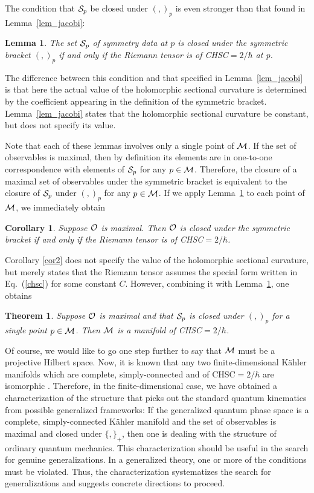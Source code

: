 \documentclass[12pt,aps,eqsecnum,tighten,nofootinbib]{revtex4-2}
\newtheorem{theorem}{Theorem}[section]
\newtheorem{lemma}{Lemma}[section]
\def\M{{\cal M}}
\newcommand{\eqn}[1]{Eq.~(\ref{#1})}
\newtheorem{cor}{Corollary}
\begin{document}
The condition that ${\cal S}_p$ be closed under $( , )_p$ is even stronger
than that found in Lemma~\ref{lem_jacobi}:
%
\begin{lemma}\label{lem_sb}
The set ${\cal S}_p$ of symmetry data at $p$ is closed under
the symmetric bracket $( , )_p$ if and only if the Riemann
tensor is of CHSC$=2/\hbar$ at p.
\end{lemma}
%
The difference between this condition and that specified in
Lemma~\ref{lem_jacobi} is that here the actual value of the
holomorphic sectional curvature is determined by the coefficient
appearing in the definition of the symmetric bracket.
Lemma~\ref{lem_jacobi} states that the holomorphic sectional curvature
be constant, but does not specify its value.

Note that each of these lemmas involves only a single point of $\M$.
If the set of observables is maximal, then by definition its elements
are in one-to-one correspondence with elements of ${\cal S}_p$ for any
$p\in\M$.  Therefore, the closure of a maximal set of observables
under the symmetric bracket is equivalent to the closure of ${\cal
S}_p$ under $( , )_p$ for any $p\in\M$.  If we apply
Lemma~\ref{lem_sb} to each point of $\M$, we immediately obtain
%
\begin{cor}
Suppose ${\cal O}$ is maximal.  Then ${\cal O}$ is closed under
the symmetric bracket if and only if the Riemann tensor is
of CHSC$=2/\hbar$.
\end{cor}
%

Corollary \ref{cor2}  does not specify the value of the holomorphic
sectional curvature, but merely states that the Riemann tensor assumes
the special form written in \eqn{chsc} for some constant $C$.  However,
combining it with Lemma~\ref{lem_sb}, one obtains
%
\begin{theorem}
Suppose ${\cal O}$ is maximal and that ${\cal S}_p$ is
closed under $( , )_p$ for a single point $p\in\M$.  Then
$\M$ is a manifold of CHSC$=2/\hbar$.

\end{theorem}

Of course, we would like to go one step further to say that $\M$ must
be a projective Hilbert space. Now, it is known that any two
finite-dimensional K\"ahler manifolds which are complete,
simply-connected and of CHSC$=2/\hbar$ are isomorphic \cite{yano}.
Therefore, in the finite-dimensional case, we have obtained a
characterization of the structure that picks out the standard quantum
kinematics from possible generalized frameworks: If the generalized
quantum phase space is a complete, simply-connected K\"ahler manifold
and the set of observables is maximal and closed under $\{ , \}_+$,
then one is dealing with the structure of ordinary quantum
mechanics. This characterization should be useful in the search for
genuine generalizations. In a generalized theory, one or more of the
conditions must be violated. Thus, the characterization systematizes
the search for generalizations and suggests concrete directions to
proceed.
\end{document}
